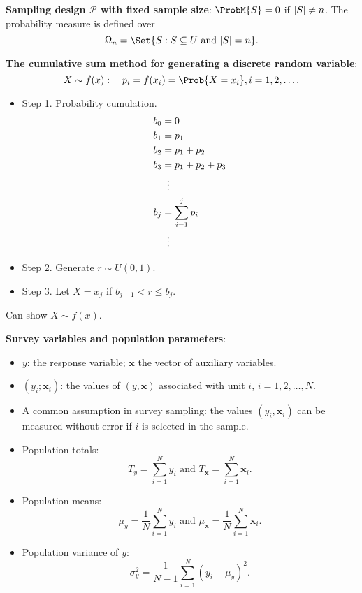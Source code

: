 \documentclass[oneside]{book}\usepackage[]{graphicx}\usepackage[svgnames]{xcolor}
\providecommand\given{} %
\renewcommand\given{\nonscript\:\delimsize\vert\nonscript\:\mathopen{}}%
\renewcommand\given{\nonscript\:\delimsize\vert\nonscript\:\mathopen{}}%
\renewcommand\given{\nonscript\:\delimsize\vert\nonscript\:\mathopen{}}%
\renewcommand\given{\nonscript\:\delimsize\vert\nonscript\:\mathopen{}}%
\renewcommand\given{\nonscript\:\delimsize\vert\nonscript\:\mathopen{}}%
\renewcommand\given{\nonscript\:\delimsize\vert\nonscript\:\mathopen{}}%
\renewcommand\given{\nonscript\:\delimsize\vert\nonscript\:\mathopen{}}%
\renewcommand\given{\nonscript\:\delimsize\vert\nonscript\:\mathopen{}}%
\renewcommand\given{\nonscript\:\delimsize\vert\nonscript\:\mathopen{}}%
\renewcommand\given{\nonscript\:\delimsize\vert\nonscript\:\mathopen{}}%
\renewcommand\given{\nonscript\:\delimsize\vert\nonscript\:\mathopen{}}%
\renewcommand\given{\nonscript\:\delimsize\vert\nonscript\:\mathopen{}}%
\renewcommand\given{\nonscript\:\delimsize\vert\nonscript\:\mathopen{}}%
\DeclarePairedDelimiter\abs{\lvert}{\rvert}
\renewcommand\given{:}
\providecommand{\Vector}[1]{\bm{#1}}%
\begin{document}
\textbf{Sampling design $ \mathcal{P} $ with fixed sample size}: $ \ProbM{S}=0 $
if $ \abs{S}\ne n $. The probability measure is defined over
\[ \Omega_n=\Set{S\given S\subseteq U\text{ and }\abs{S}=n}. \]
\begin{Example}{}
      \textbf{The cumulative sum method for generating a discrete random
            variable}:
      \[ X \sim f(x):\quad p_i=f(x_i)=\Prob{X=x_i},i=1,2,\ldots. \]
      \begin{itemize}
            \item Step 1. Probability cumulation.
                  \begin{align*}
                        b_0 & =0                 \\
                        b_1 & =p_1               \\
                        b_2 & =p_1+p_2           \\
                        b_3 & =p_1+p_2+p_3       \\
                            & \vdotswithin{=}    \\
                        b_j & =\sum_{i=1}^{j}p_i \\
                            & \vdotswithin{=}
                  \end{align*}
            \item Step 2. Generate $ r\sim U(0,1) $.
            \item Step 3. Let $ X=x_j $ if $ b_{j-1}<r\le b_j $.
      \end{itemize}
      Can show $ X \sim f(x) $.
\end{Example}
\textbf{Survey variables and population parameters}:
\begin{itemize}
      \item $ y $: the response variable; $ \Vector{x} $
            the vector of auxiliary variables.
      \item $ (y_i;\Vector{x}_i) $: the values of $ (y,\Vector{x}) $
            associated with unit $ i $, $ i=1,2,\ldots,N $.
      \item A common assumption in survey sampling: the values $ (y_i,\Vector{x}_i) $
            can be measured without error if $ i $ is selected in the sample.
      \item Population totals:
            \[ T_y=\sum_{i=1}^{N}y_i\text{ and }T_{\Vector{x}}=\sum_{i=1}^{N}\Vector{x}_i. \]
      \item Population means:
            \[ \mu_y=\frac{1}{N}\sum_{i=1}^{N}y_i\text{ and }\mu_{\Vector{x}}=\frac{1}{N}\sum_{i=1}^{N}\Vector{x}_i. \]
      \item Population variance of $ y $:
            \[ \sigma_y^2=\frac{1}{N-1}\sum_{i=1}^{N}(y_i-\mu_y)^2. \]
\end{itemize}
\end{document}
